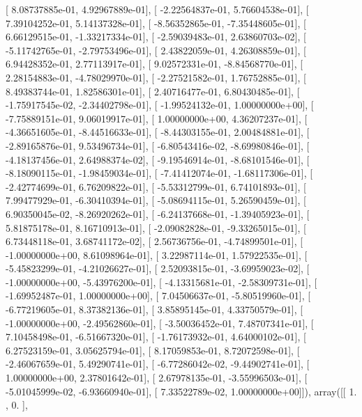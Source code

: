 \documentclass{article}
\begin{document}
       [  8.08737885e-01,   4.92967889e-01],
       [ -2.22564837e-01,   5.76604538e-01],
       [  7.39104252e-01,   5.14137328e-01],
       [ -8.56352865e-01,  -7.35448605e-01],
       [  6.66129515e-01,  -1.33217334e-01],
       [ -2.59039483e-01,   2.63860703e-02],
       [ -5.11742765e-01,  -2.79753496e-01],
       [  2.43822059e-01,   4.26308859e-01],
       [  6.94428352e-01,   2.77113917e-01],
       [  9.02572331e-01,  -8.84568770e-01],
       [  2.28154883e-01,  -4.78029970e-01],
       [ -2.27521582e-01,   1.76752885e-01],
       [  8.49383744e-01,   1.82586301e-01],
       [  2.40716477e-01,   6.80430485e-01],
       [ -1.75917545e-02,  -2.34402798e-01],
       [ -1.99524132e-01,   1.00000000e+00],
       [ -7.75889151e-01,   9.06019917e-01],
       [  1.00000000e+00,   4.36207237e-01],
       [ -4.36651605e-01,  -8.44516633e-01],
       [ -8.44303155e-01,   2.00484881e-01],
       [ -2.89165876e-01,   9.53496734e-01],
       [ -6.80543416e-02,  -8.69980846e-01],
       [ -4.18137456e-01,   2.64988374e-02],
       [ -9.19546914e-01,  -8.68101546e-01],
       [ -8.18090115e-01,  -1.98459034e-01],
       [ -7.41412074e-01,  -1.68117306e-01],
       [ -2.42774699e-01,   6.76209822e-01],
       [ -5.53312799e-01,   6.74101893e-01],
       [  7.99477929e-01,  -6.30410394e-01],
       [ -5.08694115e-01,   5.26590459e-01],
       [  6.90350045e-02,  -8.26920262e-01],
       [ -6.24137668e-01,  -1.39405923e-01],
       [  5.81875178e-01,   8.16710913e-01],
       [ -2.09082828e-01,  -9.33265015e-01],
       [  6.73448118e-01,   3.68741172e-02],
       [  2.56736756e-01,  -4.74899501e-01],
       [ -1.00000000e+00,   8.61098964e-01],
       [  3.22987114e-01,   1.57922535e-01],
       [ -5.45823299e-01,  -4.21026627e-01],
       [  2.52093815e-01,  -3.69959023e-02],
       [ -1.00000000e+00,  -5.43976200e-01],
       [ -4.13315681e-01,  -2.58309731e-01],
       [ -1.69952487e-01,   1.00000000e+00],
       [  7.04506637e-01,  -5.80519960e-01],
       [ -6.77219605e-01,   8.37382136e-01],
       [  3.85895145e-01,   4.33750579e-01],
       [ -1.00000000e+00,  -2.49562860e-01],
       [ -3.50036452e-01,   7.48707341e-01],
       [  7.10458498e-01,  -6.51667320e-01],
       [ -1.76173932e-01,   4.64000102e-01],
       [  6.27523159e-01,   3.05625794e-01],
       [  8.17059853e-01,   8.72072598e-01],
       [ -2.46067659e-01,   5.49290741e-01],
       [ -6.77286042e-02,  -9.44902741e-01],
       [  1.00000000e+00,   2.37801642e-01],
       [  2.67978135e-01,  -3.55996503e-01],
       [ -5.01045999e-02,  -6.93660940e-01],
       [  7.33522789e-02,   1.00000000e+00]]), array([[ 1.        ,  0.        ],
\end{document}
